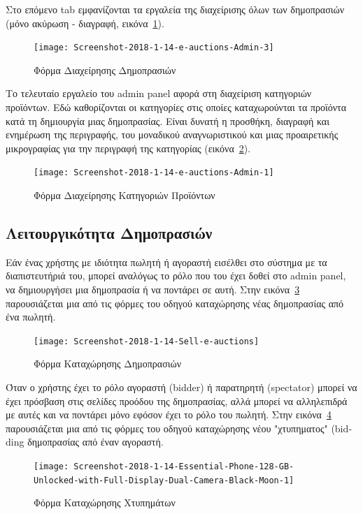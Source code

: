 \documentclass[12pt]{report}
\begin{document}
Στο επόμενο \textlatin{tab} εμφανίζονται τα εργαλεία της διαχείρισης όλων των δημοπρασιών (μόνο ακύρωση - διαγραφή, εικόνα~\ref{fig:auction_admin}).
\begin{figure}[H]
\centering
\texttt{[image: Screenshot-2018-1-14-e-auctions-Admin-3]}
\caption{Φόρμα Διαχείρησης Δημοπρασιών}
\label{fig:auction_admin}
\end{figure}

Το τελευταίο εργαλείο του \textlatin{admin panel} αφορά στη διαχείριση κατηγοριών προϊόντων. Εδώ καθορίζονται οι κατηγορίες στις οποίες καταχωρούνται τα προϊόντα κατά τη δημιουργία μιας δημοπρασίας. Είναι δυνατή η προσθήκη, διαγραφή και ενημέρωση της περιγραφής, του μοναδικού αναγνωριστικού και μιας προαιρετικής μικρογραφίας για την περιγραφή της κατηγορίας (εικόνα~\ref{fig:category_admin}).
\begin{figure}[H]
\centering
\texttt{[image: Screenshot-2018-1-14-e-auctions-Admin-1]}
\caption{Φόρμα Διαχείρησης Κατηγοριών Προϊόντων}
\label{fig:category_admin}
\end{figure}

\subsection{Λειτουργικότητα Δημοπρασιών}
Εάν ένας χρήστης με ιδιότητα πωλητή ή αγοραστή εισέλθει στο σύστημα με τα διαπιστευτήριά του, μπορεί αναλόγως το ρόλο που του έχει δοθεί στο \textlatin{admin panel}, να δημιουργήσει μια δημοπρασία ή να ποντάρει σε αυτή. Στην εικόνα~\ref{fig:auction_new} παρουσιάζεται μια από τις φόρμες του οδηγού καταχώρησης νέας δημοπρασίας από ένα πωλητή.
\begin{figure}[H]
\centering
\texttt{[image: Screenshot-2018-1-14-Sell-e-auctions]}
\caption{Φόρμα Καταχώρησης Δημοπρασιών}
\label{fig:auction_new}
\end{figure}

Όταν ο χρήστης έχει το ρόλο αγοραστή (\textlatin{bidder}) ή παρατηρητή (\textlatin{spectator}) μπορεί να έχει πρόσβαση στις σελίδες προόδου της δημοπρασίας, αλλά μπορεί να αλληλεπιδρά με αυτές και να ποντάρει μόνο εφόσον έχει το ρόλο του πωλητή. Στην εικόνα~\ref{fig:auction_bid} παρουσιάζεται μια από τις φόρμες του οδηγού καταχώρησης νέου "χτυπηματος" (\textlatin{bidding} δημοπρασίας από έναν αγοραστή.
\begin{figure}[H]
\centering
\texttt{[image: Screenshot-2018-1-14-Essential-Phone-128-GB-Unlocked-with-Full-Display-Dual-Camera-Black-Moon-1]}
\caption{Φόρμα Καταχώρησης Χτυπημάτων}
\label{fig:auction_bid}
\end{figure}
\end{document}
